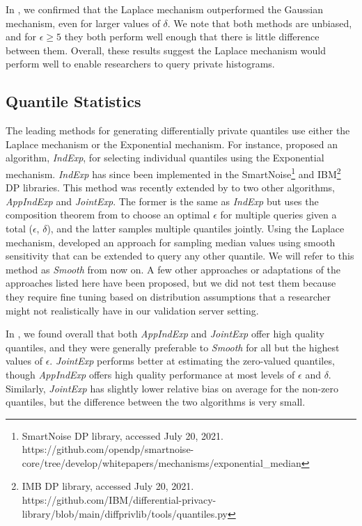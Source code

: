 In \cite{barrientos2021}, we confirmed that the Laplace mechanism outperformed the Gaussian mechanism, even for larger values of $\delta$. We note that both methods are unbiased, and for $\epsilon \geq 5$ they both perform well enough that there is little difference between them. Overall, these results suggest the Laplace mechanism would perform well to enable researchers to query private histograms.

\subsection{Quantile Statistics}
The leading methods for generating differentially private quantiles use either the Laplace mechanism or the Exponential mechanism. For instance, \cite{smith2011privacy} proposed an algorithm, \textit{IndExp}, for selecting individual quantiles using the Exponential mechanism. \textit{IndExp} has since been implemented in the SmartNoise\footnote{SmartNoise DP library, accessed July 20, 2021. https://github.com/opendp/smartnoise-core/tree/develop/whitepapers/mechanisms/exponential\_median} and IBM\footnote{IMB DP library, accessed July 20, 2021. https://github.com/IBM/differential-privacy-library/blob/main/diffprivlib/tools/quantiles.py} DP libraries. This method was recently extended by \cite{gillenwater2021differentially} to two other algorithms, \textit{AppIndExp} and \textit{JointExp}. The former is the same as \textit{IndExp} but uses the composition theorem from \cite{dong2020optimal} to choose an optimal $\epsilon$ for multiple queries given a total ($\epsilon$, $\delta$), and the latter samples multiple quantiles jointly. Using the Laplace mechanism, \cite{nissim2007smooth} developed an approach for sampling median values using smooth sensitivity that can be extended to query any other quantile. We will refer to this method as \textit{Smooth} from now on. A few other approaches or adaptations of the approaches listed here have been proposed, but we did not test them because they require fine tuning based on distribution assumptions that a researcher might not realistically have in our validation server setting.

In \cite{barrientos2021}, we found overall that both \textit{AppIndExp} and \textit{JointExp} offer high quality quantiles, and they were generally preferable to \textit{Smooth} for all but the highest values of $\epsilon$. \textit{JointExp} performs better at estimating the zero-valued quantiles, though \textit{AppIndExp} offers high quality performance at most levels of $\epsilon$ and $\delta$. Similarly, \textit{JointExp} has slightly lower relative bias on average for the non-zero quantiles, but the difference between the two algorithms is very small. 

